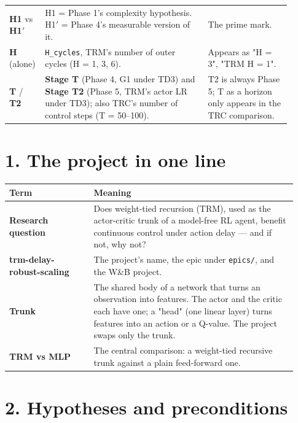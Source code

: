 \documentclass[11pt]{article}
\begin{document}
\begin{center}
\begin{tabular}{>{\raggedright\arraybackslash}p{0.069\linewidth}>{\raggedright\arraybackslash}p{0.557\linewidth}>{\raggedright\arraybackslash}p{0.280\linewidth}}
\textbf{H1} vs \textbf{H1$'$} & H1 = Phase 1's complexity hypothesis. H1$'$ = Phase 4's measurable version of it. & The prime mark. \\
\textbf{H} (alone) & \texttt{H\_cycles}, TRM's number of outer cycles (H = 1, 3, 6). & Appears as "H = 3", "TRM H = 1". \\
\textbf{T} / \textbf{T2} & \textbf{Stage T} (Phase 4, G1 under TD3) and \textbf{Stage T2} (Phase 5, TRM's actor LR under TD3); also TRC's number of control steps (T = 50--100). & T2 is always Phase 5; T as a horizon only appears in the TRC comparison. \\
\bottomrule
\end{tabular}\end{center}



\medskip



\section*{1. The project in one line}



\begin{center}\small\begin{tabular}{>{\raggedright\arraybackslash}p{0.276\linewidth}>{\raggedright\arraybackslash}p{0.658\linewidth}}
\toprule
Term & Meaning \\
\midrule
\textbf{Research question} & Does weight-tied recursion (TRM), used as the actor-critic trunk of a model-free RL agent, benefit continuous control under action delay --- and if not, why not? \\
\textbf{trm-delay-robust-scaling} & The project's name, the epic under \texttt{epics/}, and the W\&B project. \\
\textbf{Trunk} & The shared body of a network that turns an observation into features. The actor and the critic each have one; a "head" (one linear layer) turns features into an action or a Q-value. The project swaps only the trunk. \\
\textbf{TRM vs MLP} & The central comparison: a weight-tied recursive trunk against a plain feed-forward one. \\
\bottomrule
\end{tabular}\end{center}



\section*{2. Hypotheses and preconditions}
\end{document}
